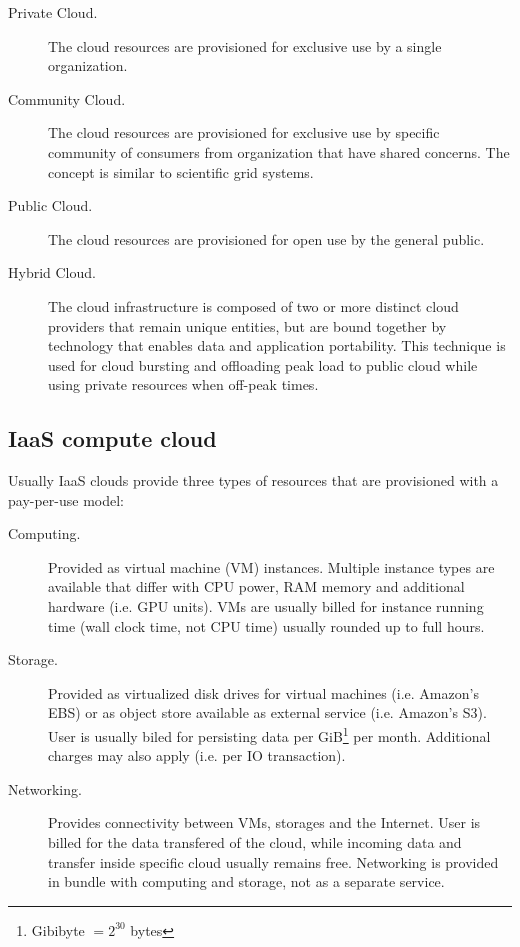 \begin{description}
  \item[Private Cloud.] The cloud resources are provisioned for exclusive use by a single organization.
  \item[Community Cloud.] The cloud resources are provisioned for exclusive use by specific community of consumers from organization that have shared concerns. The concept is similar to scientific grid systems.
  \item[Public Cloud.] The cloud resources are provisioned for open use by the general public.
  \item[Hybrid Cloud.] The cloud infrastructure is composed of two or more distinct cloud providers that remain unique entities, but are bound together by technology that enables data and application portability. This technique is used for cloud bursting and offloading peak load to public cloud while using private resources when off-peak times.
\end{description}

\subsection{IaaS compute cloud}

Usually IaaS clouds provide three types of resources that are provisioned with a pay-per-use model: 
\begin{description}
  \item[Computing.] Provided as virtual machine (VM) instances. Multiple instance types are available that differ with CPU power, RAM memory and additional hardware (i.e. GPU units). VMs are usually billed for instance running time (wall clock time, not CPU time) usually rounded up to full hours.
  \item[Storage.] Provided as virtualized disk drives for virtual machines (i.e. Amazon's EBS) or as object store available as external service (i.e. Amazon's S3). User is usually biled for persisting data per GiB\footnote{Gibibyte $= 2^{30}$ bytes} per month. Additional charges may also apply (i.e. per IO transaction).
  \item[Networking.] Provides connectivity between VMs, storages and the Internet. User is billed for the data transfered of the cloud, while incoming data and transfer inside specific cloud usually remains free. Networking is provided in bundle with computing and storage, not as a separate service.
\end{description}

